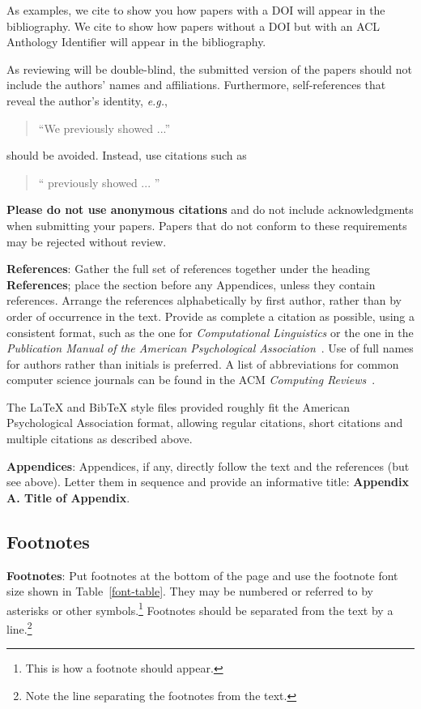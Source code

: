 \documentclass[11pt,a4paper]{article}
\begin{document}
As examples, we cite \cite{P16-1001} to show you how papers with a DOI
will appear in the bibliography.  We cite \cite{C14-1001} to show how
papers without a DOI but with an ACL Anthology Identifier will appear
in the bibliography.  

As reviewing will be double-blind, the submitted version of the papers
should not include the authors' names and affiliations. Furthermore,
self-references that reveal the author's identity, {\em e.g.},
\begin{quote}
``We previously showed \cite{Gusfield:97} ...''  
\end{quote}
should be avoided. Instead, use citations such as 
\begin{quote}
``\citeauthor{Gusfield:97} 
previously showed ... ''
\end{quote}

\textbf{Please do not use anonymous citations} and do not include
acknowledgments when submitting your papers. Papers that do not
conform to these requirements may be rejected without review.

\textbf{References}: Gather the full set of references together under
the heading \textbf{References}; place the section before any Appendices,
unless they contain references. Arrange the references alphabetically
by first author, rather than by order of occurrence in the text.
Provide as complete a citation as possible, using a consistent format,
such as the one for {\em Computational Linguistics\/} or the one in the 
{\em Publication Manual of the American 
Psychological Association\/}~\cite{APA:83}.  Use of full names for
authors rather than initials is preferred.
A list of abbreviations for common computer science journals can be found in the ACM {\em Computing Reviews\/}~\cite{ACM:83}.

The \LaTeX{} and Bib\TeX{} style files provided roughly fit the
American Psychological Association format, allowing regular citations, 
short citations and multiple citations as described above.

\textbf{Appendices}: Appendices, if any, directly follow the text and the
references (but see above).  Letter them in sequence and provide an
informative title: \textbf{Appendix A. Title of Appendix}.

\subsection{Footnotes}

\textbf{Footnotes}: Put footnotes at the bottom of the page and use the footnote font size shown in Table~\ref{font-table}. They may be numbered or referred to by asterisks or other
symbols.\footnote{This is how a footnote should appear.} Footnotes
should be separated from the text by a line.\footnote{Note the line
separating the footnotes from the text.}
\end{document}
